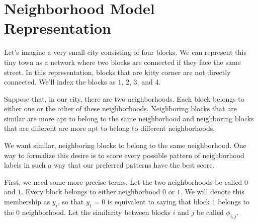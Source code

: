 \section*{Neighborhood Model Representation}
Let's imagine a very small city consisting of four blocks. We can
represent this tiny town as a network where two blocks are connected
if they face the same street. In this representation, blocks that are
kitty corner are not directly connected. We'll index the blocks as
$1$, $2$, $3$, and $4$.

\begin{figure}[h]
\centering
{}
\end{figure}

\begin{figure}[h]
\centering


\end{figure}

Suppose that, in our city, there are two neighborhoods. Each block
belongs to either one or the other of these neighborhoods. Neighboring
blocks that are similar are more apt to belong to the same
neighborhood and neighboring blocks that are different are more apt to
belong to different neighborhoods.

We want similar, neighboring blocks to belong to the same
neighborhood. One way to formalize this desire is to score every
possible pattern of neighborhood labels in such a way that our
preferred patterns have the best score.

First, we need some more precise terms. Let the two neighborhoods be
called $0$ and $1$. Every block belongs to either neighborhood $0$ or
$1$. We will denote this membership as $y_i$, so that $y_1=0$ is
equivalent to saying that block $1$ belongs to the $0$
neighborhood. Let the similarity between blocks $i$ and $j$ be called
$\phi_{i,j}$.

\begin{figure}[!h]
\centering


\end{figure}


